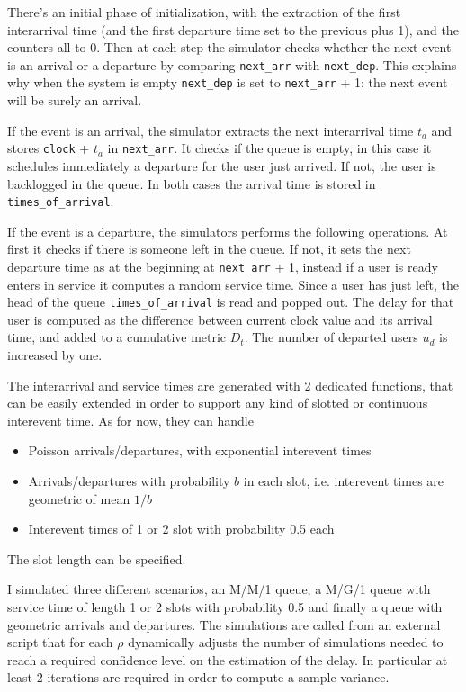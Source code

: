 \documentclass[10pt]{article}
\begin{document}
There's an initial phase of initialization, with the extraction of the first interarrival time (and the first departure time set to the previous plus 1), and the counters all to 0. Then at each step the simulator checks whether the next event is an arrival or a departure by comparing \texttt{next\_arr} with \texttt{next\_dep}. This explains why when the system is empty \texttt{next\_dep} is set to \texttt{next\_arr} + 1: the next event will be surely an arrival. 

If the event is an arrival, the simulator extracts the next interarrival time $t_a$ and stores \texttt{clock} + $t_a$ in \texttt{next\_arr}. It checks if the queue is empty, in this case it schedules immediately a departure for the user just arrived. If not, the user is backlogged in the queue. In both cases the arrival time is stored in \texttt{times\_of\_arrival}.

If the event is a departure, the simulators performs the following operations. At first it checks if there is someone left in the queue. If not, it sets the next departure time as at the beginning at \texttt{next\_arr} + 1, instead if a user is ready enters in service it computes a random service time. Since a user has just left, the head of the queue \texttt{times\_of\_arrival} is read and popped out. The delay for that user is computed as the difference between current clock value and its arrival time, and added to a cumulative metric $D_t$. The number of departed users $u_d$ is increased by one. 

The interarrival and service times are generated with 2 dedicated functions, that can be easily extended in order to support any kind of slotted or continuous interevent time. As for now, they can handle 
\begin{itemize}
\item Poisson arrivals/departures, with exponential interevent times 
\item Arrivals/departures with probability $b$ in each slot, i.e. interevent times are geometric of mean $1/b$
\item Interevent times of 1 or 2 slot with probability 0.5 each
\end{itemize}
The slot length can be specified.

I simulated three different scenarios, an M/M/1 queue, a M/G/1 queue with service time of length 1 or 2 slots with probability 0.5 and finally a queue with geometric arrivals and departures. The simulations are called from an external script that for each $\rho$ dynamically adjusts the number of simulations needed to reach a required confidence level on the estimation of the delay. In particular at least 2 iterations are required in order to compute a sample variance. 
\end{document}
